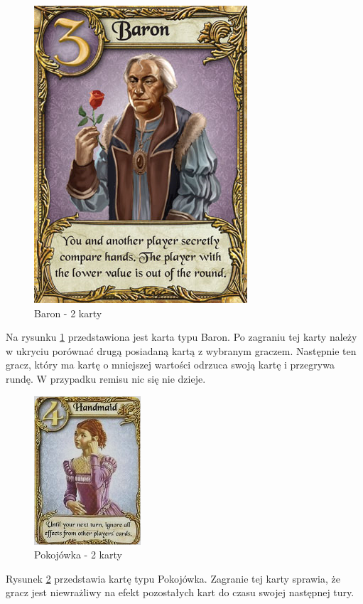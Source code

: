 \clearpage
\begin{figure}[h]
	\centering
	\includegraphics[scale=0.5]{Resources/Love_Letter_Card_Baron.png}
	\caption{Baron - 2 karty} \label{fig:Love_Letter_Card_Baron}
\end{figure}
Na rysunku \ref{fig:Love_Letter_Card_Baron} przedstawiona jest karta typu Baron. Po zagraniu tej karty należy w ukryciu porównać drugą posiadaną kartą z wybranym graczem. Następnie ten gracz, który ma kartę o mniejszej wartości odrzuca swoją kartę i przegrywa rundę. W przypadku remisu nic się nie dzieje.

\begin{figure}[h]
	\centering
	\includegraphics{Resources/Love_Letter_Card_Handmaid.png}
	\caption{Pokojówka - 2 karty} \label{fig:Love_Letter_Card_Handmaid}
\end{figure}
Rysunek \ref{fig:Love_Letter_Card_Handmaid} przedstawia kartę typu Pokojówka. Zagranie tej karty sprawia, że gracz jest niewrażliwy na efekt pozostałych kart do czasu swojej następnej tury.

